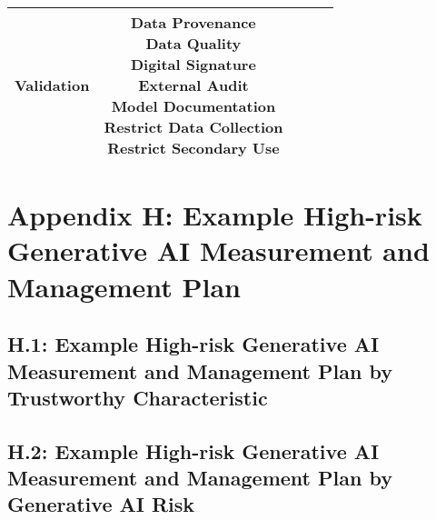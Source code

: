 \documentclass[fleqn]{article}
\begin{document}
\begin{landscape}
\begin{table}[H]
\begin{tabular}{|c|c|c|c|c|}
{			\textbullet\hspace{3pt} Validation\\ 	
		}
		& \makecell[l]{
			\textbullet\hspace{3pt} Data Provenance\\ 	
			\textbullet\hspace{3pt} Data Quality\\ 	
			\textbullet\hspace{3pt} Digital Signature\\ 	
			\textbullet\hspace{3pt} External Audit\\ 	
			\textbullet\hspace{3pt} Model Documentation \\ 
			\textbullet\hspace{3pt} Restrict Data Collection\\ 				
			\textbullet\hspace{3pt} Restrict Secondary Use\\ 							 	 
		} 
		\\
		\hline
	\end{tabular}
	\label{table:med_risk_plan_by_gai_risk_cont2}
\end{table}

\vfill
\raisebox{-10pt}{\makebox[\linewidth]{\thepage}}

\end{landscape}


\section*{Appendix H: Example High-risk Generative AI Measurement and Management Plan}\label{sec:appndxh}

\subsection*{H.1: Example High-risk Generative AI Measurement and Management Plan by Trustworthy Characteristic}\label{appdxh1}

\subsection*{H.2: Example High-risk Generative AI Measurement and Management Plan by Generative AI Risk}\label{appdxh2}
\end{document}
